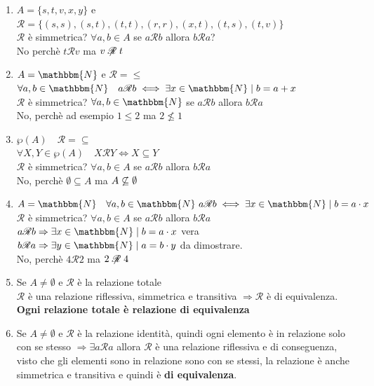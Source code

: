 \documentclass[12pt, letterpaper]{report}
\begin{document}
		\begin{enumerate}
			\item $A = \{s,t,v,x,y\}$ e $\mathscr{R} = \{(s,s), (s,t), (t,t), (r,r), (x, t), (t, s), (t,v)\}$ \\
			$\mathscr{R}$ è simmetrica? $\forall a,b \in A$ se $a \mathscr{R} b$ allora $b \mathscr{R} a$? \\
			No perchè $t \mathscr{R} v$ ma $v \centernot{\mathscr{R}} t$
			\item $A = \mathbbm{N}$ e $\mathscr{R} = \leq$ \\
			$\forall a,b \in \mathbbm{N} \quad a \mathscr{R} b \iff \exists x \in \mathbbm{N} \mid b = a + x$ \\
			$\mathscr{R}$ è simmetrica? $\forall a,b \in \mathbbm{N}$ se $a \mathscr{R} b$ allora $b \mathscr{R} a$ \\
			No, perchè ad esempio $1 \leq 2$ ma $2 \nleq 1$
			\item $\wp(A) \quad \mathscr{R} = \subseteq$ \\
			$\forall X, Y \in \wp(A) \quad X \mathscr{R} Y \iff X \subseteq Y$ \\
			$\mathscr{R}$ è simmetrica? $\forall a,b \in A$ se $a \mathscr{R} b$ allora $b \mathscr{R} a$ \\
			No, perchè $\emptyset \subseteq A$ ma $A \centernot{\subseteq} \emptyset$
			\item  $A = \mathbbm{N} \quad \forall a,b \in \mathbbm{N}\ a \mathscr{R} b \iff \exists x \in \mathbbm{N} \mid b = a \cdot x$ \\
			$\mathscr{R}$ è simmetrica? $\forall a,b \in A$ se $a \mathscr{R} b$ allora $b \mathscr{R} a$ \\
			$a \mathscr{R} b \Rightarrow \exists x \in \mathbbm{N} \mid b = a \cdot x$ vera \\
			$b \mathscr{R} a \Rightarrow \exists y \in \mathbbm{N} \mid a = b \cdot y$ da dimostrare. \\
			No, perchè $4 \mathscr{R} 2$ ma $2 \centernot{\mathscr{R}} 4$
			\item Se $A \neq \emptyset $ e $\mathscr{R}$ è la relazione totale \\
			$\mathscr{R}$ è una relazione riflessiva, simmetrica e transitiva $\Rightarrow \mathscr{R}$ è di equivalenza. \\
			\textbf{\color{red} Ogni relazione totale è relazione di equivalenza}
			\item Se $A \neq \emptyset$ e $\mathscr{R}$ è la relazione identità, quindi ogni elemento è in relazione solo con se stesso $\Rightarrow \exists a \mathscr{R} a$ allora $\mathscr{R}$ è una relazione riflessiva e di conseguenza, visto che gli elementi sono in relazione sono con se stessi, la relazione è anche simmetrica e transitiva e quindi è \textbf{di equivalenza}. \\

\end{enumerate}
\end{document}

